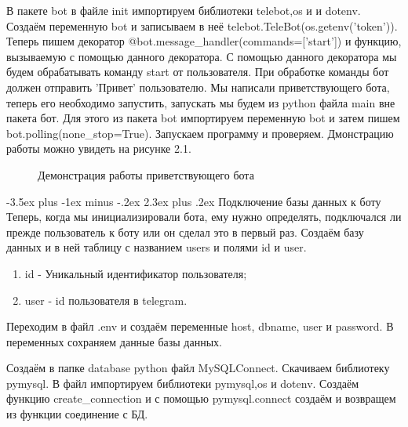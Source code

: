 \documentclass[12pt, oldlfont, amsfonts]{report}
\makeatletter
\renewcommand{\section}{\@startsection{section}{1}{0pt}%
                                {-3.5ex plus -1ex minus -.2ex}%
                                {2.3ex plus .2ex}%
{\centering\hyphenpenalty=10000\normalfont\Large\bfseries}}
\makeatother
\begin{document}
В пакете bot в файле { init} импортируем библиотеки telebot,os и и dotenv. Создаём переменную bot и записываем в неё { telebot.TeleBot(os.getenv('token'))}. Теперь пишем декоратор { @bot.message\_handler(commands=['start'])} и функцию, вызываемую с помощью данного декоратора. С помощью данного декоратора мы будем обрабатывать команду start от пользователя. При обработке команды бот должен отправить 'Привет' пользователю. Мы написали приветствующего бота, теперь его необходимо запустить, запускать мы будем из python файла main вне пакета бот. Для этого из пакета bot импортируем переменную bot и затем пишем { bot.polling(none\_stop=True)}. Запускаем программу и проверяем. Дмонстрацию работы можно увидеть на рисунке 2.1.


\begin{figure}[h!]
\caption{Демонстрация работы приветствующего бота}
\label{fig:1.jpeg}
\end{figure}

 
\section{Подключение базы данных к боту}
Теперь, когда мы инициализировали бота, ему нужно определять, подключался ли прежде пользователь к боту или он сделал это в первый раз. Создаём базу данных и в ней таблицу с названием { users} и полями { id} и { user}.

\begin{enumerate}
\item { id} - Уникальный идентификатор пользователя;
\item { user} - id пользователя в telegram.
\end{enumerate}	
Переходим в файл { .env} и создаём переменные { host},{ dbname}, { user} и { password}. В переменных сохраняем данные базы данных.

Создаём в папке database python файл MySQLConnect. Скачиваем библиотеку { pymysql}. В файл импортируем библиотеки pymysql,os и dotenv. Создаём функцию { create\_connection} и с помощью { pymysql.connect} создаём и возвращем из функции соединение с БД. 
\end{document}
